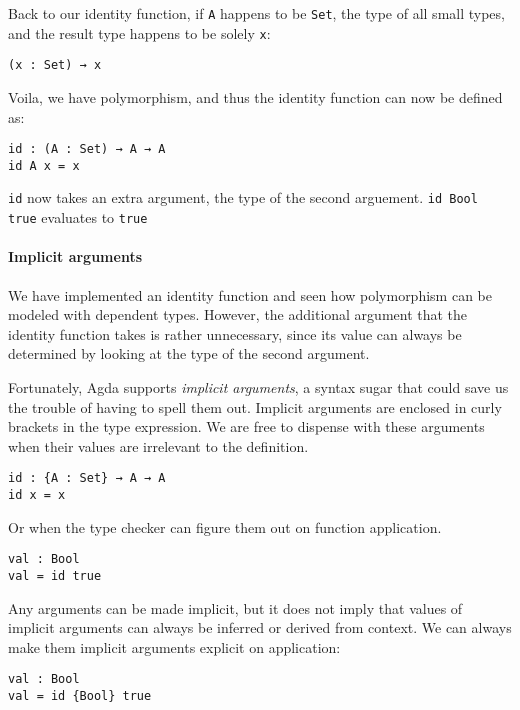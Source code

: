 \documentclass[12pt, a4paper]{article}
\begin{document}
Back to our identity function, if {\lstinline|A|} happens to be {\lstinline|Set|},
the type of all small types, and the result type happens to be solely {\lstinline|x|}:

\begin{lstlisting}
(x : Set) → x
\end{lstlisting}

Voila, we have polymorphism, and thus the identity function can now be defined as:

\begin{lstlisting}
id : (A : Set) → A → A
id A x = x
\end{lstlisting}

{\lstinline|id|} now takes an extra argument, the type of the second arguement.
{\lstinline|id Bool true|} evaluates to {\lstinline|true|}

\paragraph{Implicit arguments}

We have implemented an identity function and seen how polymorphism can be modeled
with dependent types. However, the additional argument that the identity function
takes is rather unnecessary, since its value can always be determined by looking
at the type of the second argument.

Fortunately, Agda supports \textit{implicit arguments}, a syntax sugar that could
save us the trouble of having to spell them out. Implicit arguments are enclosed
in curly brackets in the type expression. We are free to dispense with these arguments
when their values are irrelevant to the definition.

\begin{lstlisting}
id : {A : Set} → A → A
id x = x
\end{lstlisting}

Or when the type checker can figure them out on function application.

\begin{lstlisting}
val : Bool
val = id true
\end{lstlisting}

Any arguments can be made implicit, but it does not imply that values of
implicit arguments can always be inferred or derived from context. We can always
make them implicit arguments explicit on application:

\begin{lstlisting}
val : Bool
val = id {Bool} true
\end{lstlisting}
\end{document}
